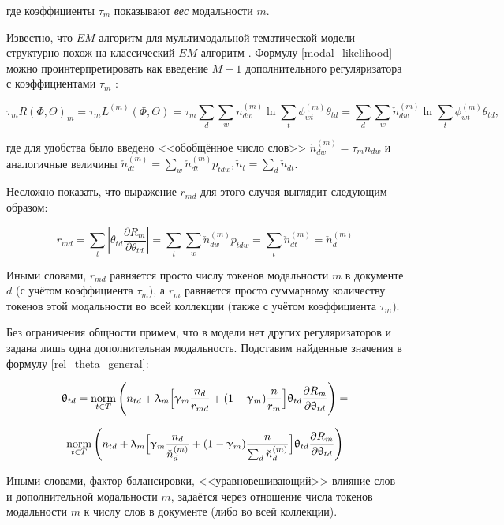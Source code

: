 где коэффициенты $\tau_m$ показывают \textit{вес} модальности $m$.

Известно, что $EM$-алгоритм для мультимодальной тематической модели структурно похож на классический $EM$-алгоритм \cite{voron15nonbayesian}. Формулу \eqref{modal_likelihood} можно проинтерпретировать как введение $M-1$ дополнительного регуляризатора с коэффициентами $\tau_m$ \cite{voron15nonbayesian}:

\[
\tau_m R(\Phi, \Theta)_m = \tau_m L^{(m)}(\Phi, \Theta) = \tau_m  \sum_d \sum_w n_{dw}^{(m)} \ln \sum_t \phi_{wt}^{(m)}\theta_{td} =
\sum_d \sum_w \check{n}_{dw}^{(m)} \ln \sum_t \phi_{wt}^{(m)}\theta_{td},
\]

где для удобства было введено <<обобщённое число слов>> $\check{n}_{dw}^{(m)} = \tau_m n_{dw}$ и аналогичные величины $\check{n}_{dt}^{(m)} = \sum_w \check{n}_{dt}^{(m)} p_{tdw}, \check{n}_t = \sum_d \check{n}_{dt}$.

Несложно показать, что выражение $r_{md}$ для этого случая выглядит следующим образом:

\[
r_{md} = \sum_t |\theta_{td} \frac{\partial R_m}{\partial \theta_{td}}| = \sum_t \sum_w \check{n}_{dw}^{(m)} p_{tdw} = \sum_t  \check{n}_{dt}^{(m)} = \check{n}_{d}^{(m)}
\]

Иными словами, $r_{md}$ равняется просто числу токенов модальности $m$ в документе $d$ (с учётом коэффициента $\tau_m$), а $r_m$ равняется просто суммарному количеству токенов этой модальности во всей коллекции (также с учётом коэффициента $\tau_m$).

Без ограничения общности примем, что в модели нет других регуляризаторов и задана лишь одна дополнительная модальность. Подставим найденные значения в формулу \eqref{rel_theta_general}:

\[
\uptheta_{td} = \mathop{\mathrm{norm}}\limits_{t \in T} \Bigg(
    n_{td} + \uplambda_m \Big[
        \upgamma_m \frac{n_d}{r_{md}} + (1-\upgamma_m)\frac{n}{r_m}
        \Big]
    \uptheta_{td} \frac{\partial R_m}{\partial \uptheta_{td}}
\Bigg) =
\]

\[
\mathop{\mathrm{norm}}\limits_{t \in T} \Bigg(
    n_{td} + \uplambda_m \Big[
        \upgamma_m \frac{n_d}{\check{n}_d^{(m)}} + (1-\upgamma_m)\frac{n}{\sum_d \check{n}_d^{(m)}}
        \Big]
    \uptheta_{td} \frac{\partial R_m}{\partial \uptheta_{td}}
\Bigg)
\]

Иными словами, фактор балансировки, <<уравновешивающий>> влияние слов и дополнительной модальности $m$, задаётся через отношение числа токенов модальности $m$ к числу слов в документе (либо во всей коллекции).

